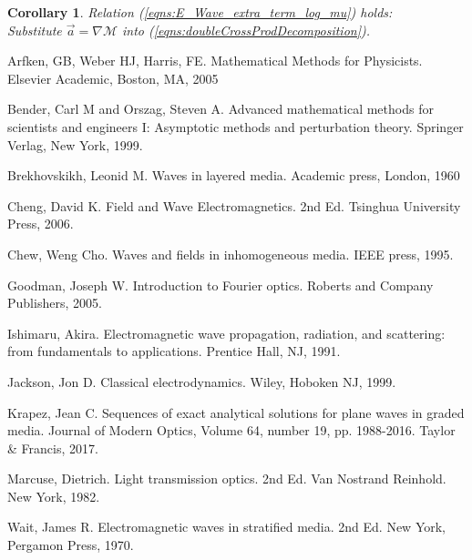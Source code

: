 \documentclass[twocolumn,secnumarabic,amssymb, nobibnotes, aps, prd]{revtex4-1}
\newtheorem{cor}{Corollary}[subsubsection]
\begin{document}
\begin{cor} Relation (\ref{eqns:E_Wave_extra_term_log_mu}) holds:\\
Substitute $\overrightarrow{a} = \nabla\mathcal{M}$ into (\ref{eqns:doubleCrossProdDecomposition}). 

\end{cor}













%

\begin{thebibliography}{2d}

Arfken, GB, Weber HJ,  Harris, FE. Mathematical Methods for Physicists. Elsevier Academic, Boston, MA, 2005

Bender, Carl M and Orszag, Steven A. Advanced mathematical methods for scientists and engineers I: Asymptotic methods and perturbation theory. Springer Verlag, New York, 1999.

Brekhovskikh, Leonid M. Waves in layered media. Academic press, London, 1960


Cheng, David K. Field and Wave Electromagnetics. 2nd Ed. Tsinghua University Press, 2006.

Chew, Weng Cho. Waves and fields in inhomogeneous media. IEEE press, 1995.

Goodman, Joseph W. Introduction to Fourier optics. Roberts and Company Publishers, 2005.

Ishimaru, Akira. Electromagnetic wave propagation, radiation, and scattering: from fundamentals to applications. Prentice Hall, NJ, 1991.


Jackson, Jon D. Classical electrodynamics. Wiley, Hoboken NJ, 1999.

Krapez, Jean C. Sequences of exact analytical solutions for plane waves in graded media. Journal of Modern Optics, Volume 64, number 19, pp. 1988-2016. Taylor \& Francis, 2017.
 


Marcuse, Dietrich. Light transmission optics. 2nd Ed. Van Nostrand Reinhold. New York, 1982. 


Wait, James R. Electromagnetic waves in stratified media. 2nd Ed. New York, Pergamon Press, 1970.





\end{thebibliography}


%	
%
%
%

%
%
%
\end{document}
